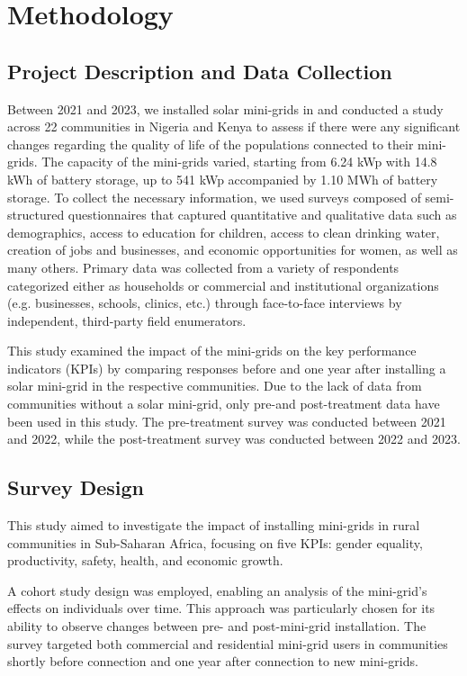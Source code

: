 \section{Methodology}
\label{sec:methodology}
\subsection{Project Description and Data Collection}
Between 2021 and 2023, we installed solar mini-grids in and conducted a study across 22 communities in Nigeria and Kenya to assess if there were any significant changes regarding the quality of life of the populations connected to their mini-grids. The capacity of the mini-grids varied, starting from 6.24 kWp with 14.8 kWh of battery storage, up to 541 kWp accompanied by 1.10 MWh of battery storage. To collect the necessary information, we used surveys composed of semi-structured questionnaires that captured quantitative and qualitative data such as demographics, access to education for children, access to clean drinking water, creation of jobs and businesses, and economic opportunities for women, as well as many others. Primary data was collected from a variety of respondents categorized either as households or commercial and institutional organizations (e.g. businesses, schools, clinics, etc.) through face-to-face interviews by independent, third-party field enumerators.

This study examined the impact of the mini-grids on the key performance indicators (KPIs) by comparing responses before and one year after installing a solar mini-grid in the respective communities. Due to the lack of data from communities without a solar mini-grid, only pre-and post-treatment data have been used in this study. The pre-treatment survey was conducted between 2021 and 2022, while the post-treatment survey was conducted between 2022 and 2023.

\subsection{Survey Design} 
This study aimed to investigate the impact of installing mini-grids in rural communities in Sub-Saharan Africa, focusing on five KPIs: gender equality, productivity, safety, health, and economic growth.

A cohort study design was employed, enabling an analysis of the mini-grid's effects on individuals over time. This approach was particularly chosen for its ability to observe changes between pre- and post-mini-grid installation. The survey targeted both commercial and residential mini-grid users in communities shortly before connection and one year after connection to new mini-grids.

